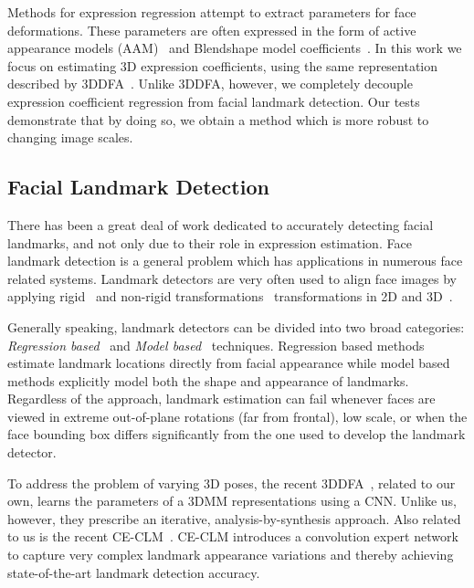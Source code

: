 \documentclass[a4paper, 10pt, conference]{ieeeconf}
\begin{document}
Methods for expression regression attempt to extract parameters for face deformations. These parameters are often expressed in the form of active appearance models (AAM)~\cite{lucey2010extended} and Blendshape model coefficients~\cite{richardson2016learning,zhu2015,zhu2015high}. In this work we focus on estimating 3D expression coefficients, using the same representation described by 3DDFA~\cite{zhu2015}. Unlike 3DDFA, however, we completely decouple expression coefficient regression from facial landmark detection. Our tests demonstrate that by doing so, we obtain a method which is more robust to changing image scales.



\subsection{Facial Landmark Detection} There has been a great deal of work dedicated to accurately detecting facial landmarks, and not only due to their role in expression estimation. Face landmark detection is a general problem which has applications in numerous face related systems. Landmark detectors are very often used to align face images by applying rigid~\cite{eidinger2013age,Everingham06a,wolf:YTF} and non-rigid transformations~\cite{hassner2013viewing,jeni2015dense,zhu2015} transformations in 2D and 3D~\cite{hassner2015effective,Masi:18:learning,masi2014pose,masi2017rapid,masi16dowe}.

Generally speaking, landmark detectors can be divided into two broad categories: {\em Regression based}~\cite{burgos2013robust,king2009dlib,wu2017facial} and {\em Model based}~\cite{baltruvsaitis2016openface,zadeh2016deep,zhu2015} techniques. Regression based methods estimate landmark locations directly from facial appearance while model based methods explicitly model both the shape and appearance of landmarks. Regardless of the approach, landmark estimation can fail whenever faces are viewed in extreme out-of-plane rotations (far from frontal), low scale, or when the face bounding box differs significantly from the one used to develop the landmark detector.


To address the problem of varying 3D poses, the recent 3DDFA~\cite{zhu2015}, related to our own, learns the parameters of a 3DMM representations using a CNN. Unlike us, however, they prescribe an iterative, analysis-by-synthesis approach. Also related to us is the recent CE-CLM~\cite{zadeh2016deep}. CE-CLM introduces a convolution expert network to capture very complex landmark appearance variations and thereby achieving state-of-the-art landmark detection accuracy.
\end{document}
